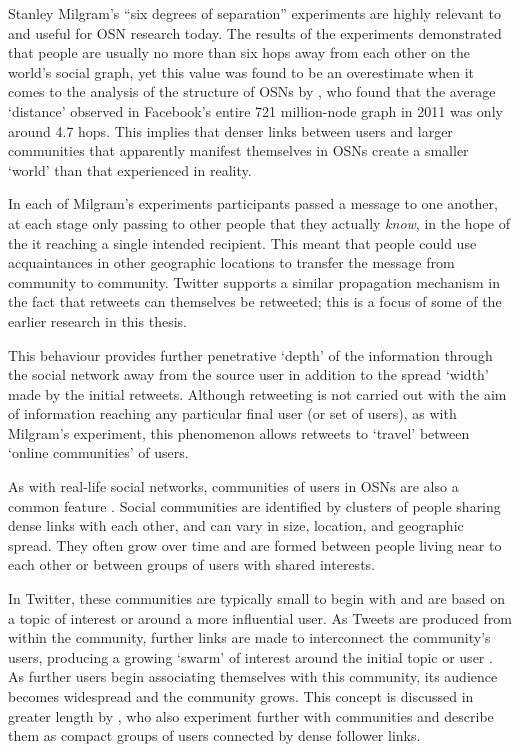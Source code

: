 Stanley Milgram's ``six degrees of separation'' \cite{milgram67} experiments are highly relevant to and useful for OSN research today. The results of the experiments demonstrated that people are usually no more than six hops away from each other on the world's social graph, yet this value was found to be an overestimate when it comes to the analysis of the structure of OSNs by \cite{backstrom11}, who found that the average `distance' observed in Facebook's entire 721 million-node graph in 2011 was only around 4.7 hops. This implies that denser links between users and larger communities that apparently manifest themselves in OSNs create a smaller `world' than that experienced in reality.

In each of Milgram's experiments participants passed a message to one another, at each stage only passing to other people that they actually \textit{know}, in the hope of the it reaching a single intended recipient. This meant that people could use acquaintances in other geographic locations to transfer the message from community to community. Twitter supports a similar propagation mechanism in the fact that retweets can themselves be retweeted; this is a focus of some of the earlier research in this thesis.

This behaviour provides further penetrative `depth' of the information through the social network away from the source user in addition to the spread `width' made by the initial retweets. Although retweeting is not carried out with the aim of information reaching any particular final user (or set of users), as with Milgram's experiment, this phenomenon allows retweets to `travel' between `online communities' of users.

As with real-life social networks, communities of users in OSNs are also a common feature \cite{ugander11}. Social communities are identified by clusters of people sharing dense links with each other, and can vary in size, location, and geographic spread. They often grow over time and are formed between people living near to each other or between groups of users with shared interests.

In Twitter, these communities are typically small to begin with and are based on a topic of interest or around a more influential user. As Tweets are produced from within the community, further links are made to interconnect the community's users, producing a growing `swarm' of interest around the initial topic or user \cite{java07}. As further users begin associating themselves with this community, its audience becomes widespread and the community grows. This concept is discussed in greater length by \cite{java07}, who also experiment further with communities and describe them as compact groups of users connected by dense follower links.

